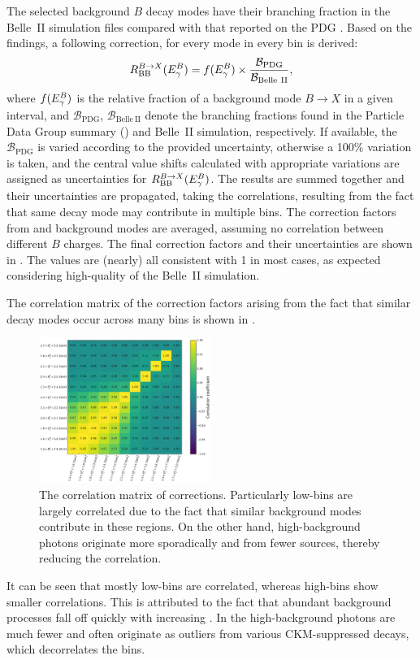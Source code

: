The selected background $B$ decay modes have their branching fraction in the Belle~II simulation files compared with that reported on the PDG \cite{Workman:2022ynf}.
Based on the findings, a following correction, for every mode in every \EB bin is derived:
\begin{equation}\label{eq:background_bf_correction}
    R^{B\rightarrow X}_{\mathrm{BB}}({E^B_{\gamma}}) =  f({E^B_{\gamma}}) \times \frac{\mathcal{B}_{\mathrm{PDG}}}{\mathcal{B}_{\mathrm{Belle~II}}},
\end{equation}
where $f({E^B_{\gamma}})$ is the relative fraction of a background mode $B\to X$ in a given \EB interval,
and $\mathcal{B}_{\mathrm{PDG}}$, $\mathcal{B}_{\mathrm{Belle~II}}$ denote the branching fractions found in the Particle Data Group summary (\cite{Workman:2022ynf}) and Belle~II simulation, respectively.
If available, the $\mathcal{B}_{\mathrm{PDG}}$ is varied according to the provided uncertainty, otherwise a 100\% variation is taken, and the central value shifts calculated with appropriate variations are assigned as uncertainties for $R^{B\rightarrow X}_{\mathrm{BB}}({E^B_{\gamma}})$.
The results are summed together and their uncertainties are propagated, taking the correlations, resulting from the fact that same decay mode may contribute in multiple \EB bins.
The correction factors from \Bp and \Bz background modes are averaged, assuming no correlation between different $B$ charges.
The final correction factors and their uncertainties are shown in .
The values are (nearly) all consistent with 1 in most cases, as expected considering high-quality of the Belle~II simulation.

The correlation matrix of the correction factors arising from the fact that similar decay modes occur across many bins is shown in .
\begin{figure}[htbp!]
    \centering
    \includegraphics[width=0.5\textwidth]{figures/data_sim_corrections/bbar_correlation_matrix.pdf}
    \caption{\label{fig:bbar_correlation_matrix} The correlation matrix of \BB corrections.
    Particularly low-\EB bins are largely correlated due to the fact that similar background modes contribute in these regions.
    On the other hand, high-\EB background photons originate more sporadically and from fewer sources, thereby reducing the correlation.
    }
\end{figure}
It can be seen that mostly low-\EB bins are correlated, whereas high-\EB bins show smaller correlations.
This is attributed to the fact that abundant background processes fall off quickly with increasing \EB.
In the high-\EB background photons are much fewer and often originate as outliers from various CKM-suppressed decays, which decorrelates the bins.

